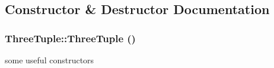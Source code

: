 \subsection{Constructor \& Destructor Documentation}
\hypertarget{classCartWheel_1_1Math_1_1ThreeTuple_a68c41a32438f1dbdeeb9a39f56ba59a3}{
\subsubsection[{ThreeTuple}]{\setlength{\rightskip}{0pt plus 5cm}ThreeTuple::ThreeTuple ()}}
\label{classCartWheel_1_1Math_1_1ThreeTuple_a68c41a32438f1dbdeeb9a39f56ba59a3}
some useful constructors 

